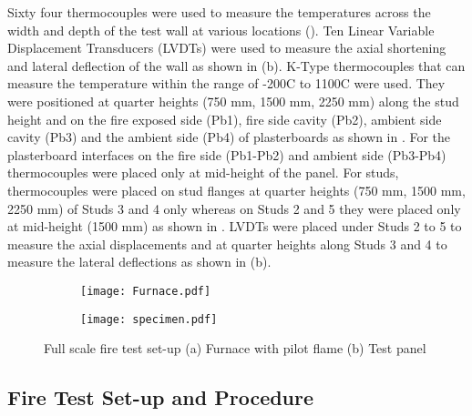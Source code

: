 Sixty four thermocouples were used to measure the temperatures across the width and depth of the test wall at various locations (). Ten Linear Variable Displacement Transducers (LVDTs) were used to measure the axial shortening and lateral deflection of the wall as shown in  (b). K-Type thermocouples that can measure the temperature within the range of -200\degree C to 1100\degree C were used. They were positioned at quarter heights (750 mm, 1500 mm, 2250 mm) along the stud height and on the fire exposed side (Pb1), fire side cavity (Pb2), ambient side cavity (Pb3) and the ambient side (Pb4) of plasterboards as shown in . For the plasterboard interfaces on the fire side (Pb1-Pb2) and ambient side (Pb3-Pb4) thermocouples were placed only at mid-height of the panel. For studs, thermocouples were placed on stud flanges at quarter heights (750 mm, 1500 mm, 2250 mm) of Studs 3 and 4 only whereas on Studs 2 and 5 they were placed only at mid-height (1500 mm) as shown in . LVDTs were placed under Studs 2 to 5 to measure the axial displacements and at quarter heights along Studs 3 and 4 to measure the lateral deflections as shown in (b).
\begin{figure}[!htbp]
	\centering
	\begin{subfigure}[b]{0.6\textwidth}
		\centering
		\texttt{[image: Furnace.pdf]}
		\caption{}
		\label{subfig:Furnace}
	\end{subfigure}
	\begin{subfigure}[b]{0.6\textwidth}
		\centering
		\texttt{[image: specimen.pdf]}
		\caption{}
		\label{subfig:specimen}
	\end{subfigure}
	   \caption{Full scale fire test set-up (a) Furnace with pilot flame (b) Test panel}
	   \label{fig:furnace-specimen}
\end{figure}

\subsection{Fire Test Set-up and Procedure}\label{sec:fire test set-up procedure}

